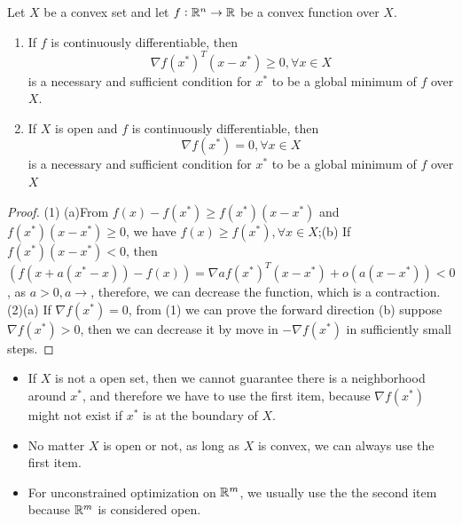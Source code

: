 \begin{refsection}
\begin{theorem}\label{ch:convex-optimization:th:FirstOrderNecessarySufficientConditionUnderConvexSet}
\cite[17]{bertsekas2016nonlinear}Let $X$ be a convex set and let $f:\mathbb{R}^n\to \mathbb{R}$ be a convex function over $X$.
\begin{enumerate}
    \item If $f$ is continuously differentiable, then
    $$\nabla f(x^*)^T(x-x^*) \geq 0, \forall x \in X$$
    is a necessary and sufficient condition for $x^*$ to be a global minimum of $f$ over $X$.
    \item If $X$ is open and $f$ is continuously differentiable, then
    $$\nabla f(x^*) = 0, \forall x \in X$$
    is a necessary and sufficient condition for $x^*$ to be a global minimum of $f$ over $X$
\end{enumerate}
\end{theorem}
\begin{proof}
(1) (a)From $f(x) - f(x^*) \geq f(x^*)(x-x^*)$ and $f(x^*)(x-x^*) \geq 0$, we have $f(x)\geq f(x^*),\forall x\in X$;(b) If $f(x^*)(x-x^*) < 0$, then $(f(x+a(x^*-x))-f(x)) = \nabla a f(x^*)^T(x-x^*) + o(a(x-x^*))<0$, as $a>0, a\to $, therefore, we can decrease the function, which is a contraction.
(2)(a) If $\nabla f(x^*) = 0$, from (1) we can prove the forward direction (b) suppose $\nabla f(x^*) > 0$, then we can decrease it by move in $-\nabla f(x^*)$ in sufficiently small steps.
\end{proof}



\begin{remark}\hfill
\begin{itemize}
\item If $X$ is not a open set, then we cannot guarantee there is a neighborhood around $x^*$, and therefore we have to use the first item, because $\nabla f(x^*)$ might not exist if $x^*$ is at the boundary of $X$.
\item No matter $X$ is open or not, as long as $X$ is convex, we can always use the first item. 
\item For unconstrained optimization on $\mathbb{R}^m$, we usually use the the second item because $\mathbb{R}^m$ is considered open.    
\end{itemize}
\end{remark}



\end{refsection}
